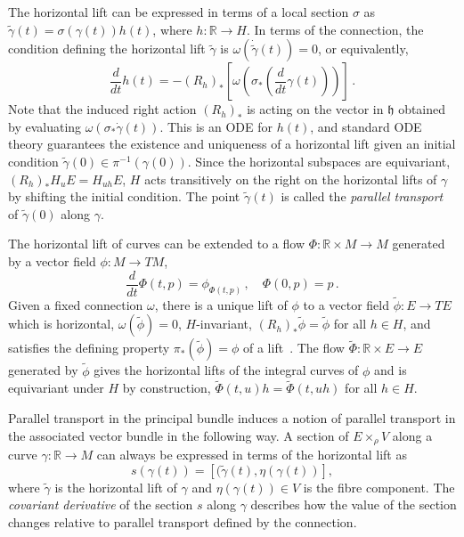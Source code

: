 \documentclass[12pt,a4paper]{article}
\numberwithin{equation}{section}
\newcommand{\R}{\mathbb{R}}
\theoremstyle{plain}
\theoremstyle{definition}
\theoremstyle{remark}
\begin{document}
The horizontal lift can be expressed in terms of a local section $\sigma$ as $\tilde{\gamma}(t) = \sigma(\gamma(t))h(t)$, where $h: \mathbb{R} \to H$. In terms of the connection, the condition defining the horizontal lift $\tilde{\gamma}$ is $\omega(\dot{\tilde{\gamma}}(t))=0$, or equivalently,
\begin{equation}\label{eqn:horizontal_lift_ode}
    \frac{d}{dt}h(t)=-(R_{h})_*\left[ \omega\left(\sigma_{*}\left(\frac{d}{dt}\gamma(t)\right)\right) \right]\,.
\end{equation}
Note that the induced right action $(R_{h})_*$ is acting on the vector in $\mathfrak{h}$ obtained by evaluating $\omega(\sigma_{*}\dot{\gamma}(t))$. This is an ODE for $h(t)$, and standard ODE theory guarantees the existence and uniqueness of a horizontal lift given an initial condition $\tilde{\gamma}(0) \in \pi^{-1}(\gamma(0))$. Since the horizontal subspaces are equivariant, $(R_h)_*H_uE=H_{uh}E$, $H$ acts transitively on the right on the horizontal lifts of $\gamma$ by shifting the initial condition. The point $\tilde{\gamma}(t)$ is called the \textit{parallel transport} of $\tilde{\gamma}(0)$ along $\gamma$. 

The horizontal lift of curves can be extended to a flow $\Phi:\R \times M \to M$ generated by a vector field $\phi: M \to TM$,
\begin{equation}
    \frac{d}{dt} \Phi(t,p) = \phi_{\Phi(t,p)} \,, \quad \Phi(0,p) = p \,.
\end{equation}
Given a fixed connection $\omega$, there is a unique lift of $\phi$ to a vector field $\tilde{\phi}: E \to TE$ which is horizontal, $\omega(\tilde{\phi})=0$, $H$-invariant, $(R_h)_*\tilde{\phi}=\tilde{\phi}$ for all $h \in H$, and satisfies the defining property $\pi_*(\tilde{\phi}) = \phi$ of a lift~\cite{Bleecker1981}. The flow $\tilde{\Phi}:\R \times E \to E$ generated by $\tilde{\phi}$ gives the horizontal lifts of the integral curves of $\phi$ and is equivariant under $H$ by construction, $\tilde{\Phi}(t,u)h = \tilde{\Phi}(t,uh)$ for all $h \in H$. 

Parallel transport in the principal bundle induces a notion of parallel transport in the associated vector bundle in the following way. A section of $E \times_{\rho} V$ along a curve $\gamma:\mathbb{R}\to M$ can always be expressed in terms of the horizontal lift as
\begin{equation}
    s(\gamma(t))=[(\tilde{\gamma}(t),\eta(\gamma(t))],
\end{equation}
where $\tilde{\gamma}$ is the horizontal lift of $\gamma$ and $\eta(\gamma(t))\in V$ is the fibre component. The \textit{covariant derivative} of the section $s$ along $\gamma$ describes how the value of the section changes relative to parallel transport defined by the connection.
\end{document}
